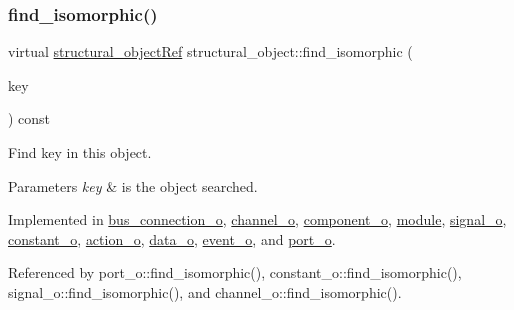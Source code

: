 \subsubsection{\texorpdfstring{find\+\_\+isomorphic()}{find\_isomorphic()}}
{\footnotesize\ttfamily virtual \hyperlink{structural__objects_8hpp_a8ea5f8cc50ab8f4c31e2751074ff60b2}{structural\+\_\+object\+Ref} structural\+\_\+object\+::find\+\_\+isomorphic (\begin{DoxyParamCaption}\item[{const \hyperlink{structural__objects_8hpp_a8ea5f8cc50ab8f4c31e2751074ff60b2}{structural\+\_\+object\+Ref}}]{key }\end{DoxyParamCaption}) const\hspace{0.3cm}{\ttfamily [pure virtual]}}



Find key in this object. 


\begin{DoxyParams}{Parameters}
{\em key} & is the object searched. \\
\hline
\end{DoxyParams}


Implemented in \hyperlink{classbus__connection__o_a13ea12ac5af275b177d449ef3a7c5546}{bus\+\_\+connection\+\_\+o}, \hyperlink{classchannel__o_a7565783de13f5451d94de9fda826710d}{channel\+\_\+o}, \hyperlink{classcomponent__o_a8bb03d2af520a73c01e330f137fd9fd4}{component\+\_\+o}, \hyperlink{classmodule_a9d8b3c8198d31d1440cb3df2fed8f346}{module}, \hyperlink{classsignal__o_a3c49fe1a0774acfff45b3a899a852a36}{signal\+\_\+o}, \hyperlink{classconstant__o_aa4bf7187d16113ee8a90b2758e03f6b5}{constant\+\_\+o}, \hyperlink{classaction__o_aeda1f184bbdd2210b45361a5da845b85}{action\+\_\+o}, \hyperlink{classdata__o_a6e9d672d84085462c777887ab7c57763}{data\+\_\+o}, \hyperlink{classevent__o_ae1021e72b16d1d6259bd5f494780ba95}{event\+\_\+o}, and \hyperlink{structport__o_a2ece93b5f3aaa09fdadbb373f3f9d31a}{port\+\_\+o}.



Referenced by port\+\_\+o\+::find\+\_\+isomorphic(), constant\+\_\+o\+::find\+\_\+isomorphic(), signal\+\_\+o\+::find\+\_\+isomorphic(), and channel\+\_\+o\+::find\+\_\+isomorphic().

